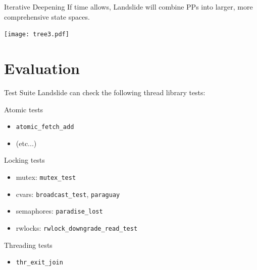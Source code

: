 \documentclass[xcolor=dvipsnames]{beamer}
\begin{document}
\begin{frame}{Iterative Deepening}
	If time allows, Landslide will combine PPs into larger, more comprehensive state spaces.
	\begin{center}
		\texttt{[image: tree3.pdf]}
	\end{center}
\end{frame}


\section{Evaluation}


\begin{frame}{Test Suite}
	Landslide can check the following thread library tests:

	Atomic tests
	\begin{itemize}
		\item {\tt atomic\_fetch\_add}
		\item (etc...)
	\end{itemize}

	Locking tests
	\begin{itemize}
		\item mutex: {\tt mutex\_test}
		\item cvars: {\tt broadcast\_test}, {\tt paraguay}
		\item semaphores: {\tt paradise\_lost}
		\item rwlocks: {\tt rwlock\_downgrade\_read\_test}
	\end{itemize}

	Threading tests
	\begin{itemize}
		\item {\tt thr\_exit\_join}
	\end{itemize}
\end{frame}
\end{document}
